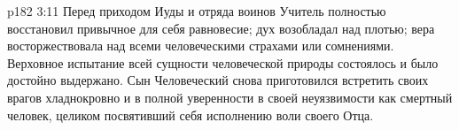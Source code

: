 \vs p182 3:11 Перед приходом Иуды и отряда воинов Учитель полностью восстановил привычное для себя равновесие; дух возобладал над плотью; вера восторжествовала над всеми человеческими страхами или сомнениями. Верховное испытание всей сущности человеческой природы состоялось и было достойно выдержано. Сын Человеческий снова приготовился встретить своих врагов хладнокровно и в полной уверенности в своей неуязвимости как смертный человек, целиком посвятивший себя исполнению воли своего Отца.
